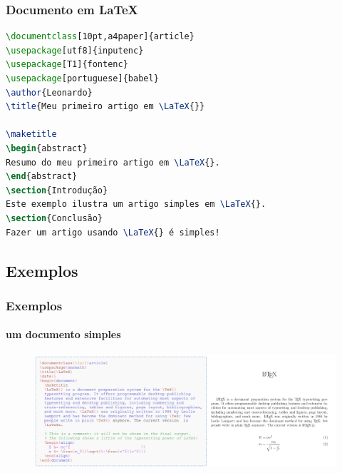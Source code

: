 \begin{frame}[fragile]
\frametitle{Documento em \LaTeX{}}
\begin{lstlisting}[language=tex, label=lst-documento, caption={Exemplo de documento em \LaTeX{}}, postbreak=\mbox{$\hookrightarrow$\space}, basicstyle=\fontsize{8}{10}\selectfont\ttfamily]
\documentclass[10pt,a4paper]{article}
\usepackage[utf8]{inputenc}
\usepackage[T1]{fontenc}
\usepackage[portuguese]{babel}
\author{Leonardo}
\title{Meu primeiro artigo em \LaTeX{}}

\maketitle
\begin{abstract}
Resumo do meu primeiro artigo em \LaTeX{}.
\end{abstract}
\section{Introdução}
Este exemplo ilustra um artigo simples em \LaTeX{}.
\section{Conclusão}
Fazer um artigo usando \LaTeX{} é simples!

\end{lstlisting} %
\end{frame}



\subsection{Exemplos}
\begin{frame}
\frametitle{Exemplos}
\framesubtitle{um documento simples}
  \begin{figure}[h!]
  \centering
  \includegraphics[width=\textwidth]{figures/exdoc.png}
  \label{fig:exdoc}
  \end{figure}
\end{frame}


